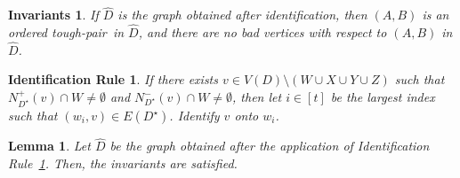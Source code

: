 \documentclass[a4paper,11pt]{article}
\theoremstyle{plain}
\newtheorem{lemma}[theorem]{Lemma}
\newtheorem{identification rule}{Identification Rule}
\newtheorem*{invariants*}{Invariants}
\theoremstyle{definition}
\theoremstyle{remark}
\newcommand{\toughpair}{tough-pair}
\begin{document}
\begin{invariants*}\label{inv:ordered-cleaning}
If $\widehat{D}$ is the graph obtained after identification, then $(A,B)$ is an ordered \toughpair\ in $\widehat{D}$, and
there are no bad vertices with respect to $(A,B)$ in $\widehat{D}$.
\end{invariants*}

\begin{identification rule}\label{ir:A}
If there exists $v \in V(D) \setminus (W \cup X \cup Y \cup Z)$ such that $N_{D^{\star}}^+(v) \cap W \neq \emptyset$ and $N_{D^{\star}}^-(v) \cap W \neq \emptyset$, then let $i \in [t]$ be the largest index such that $(w_i,v) \in E(D^{\star})$. Identify $v$ onto $w_i$.
\end{identification rule}

\begin{lemma}\label{lem:irA-safe}
Let $\widehat{D}$ be the graph obtained after the application of Identification Rule~\ref{ir:A}. Then, the invariants are satisfied.
\end{lemma}
\end{document}
